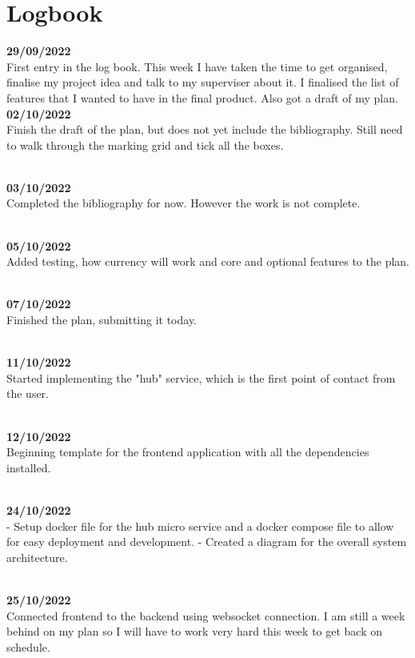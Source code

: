 \documentclass[titlepage]{article}
\begin{document}



\section{Logbook}

\textbf{29/09/2022} \\
First entry in the log book. This week I have taken the time to get organised, finalise my project idea and talk to my superviser about it. I finalised the list of features that I wanted to have in the final product. Also got a draft of my plan.
\\

\noindent
\textbf{02/10/2022} \\
Finish the draft of the plan, but does not yet include the bibliography. Still need to walk through the marking grid and tick all the boxes.

\\
\noindent
\textbf{03/10/2022} \\
Completed the bibliography for now. However the work is not complete.

\\
\noindent
\textbf{05/10/2022} \\
Added testing, how currency will work and core and optional features to the plan.

\\
\noindent
\textbf{07/10/2022} \\
Finished the plan, submitting it today.

\\
\noindent
\textbf{11/10/2022} \\
Started implementing the "hub" service, which is the first point of contact from the user.

\\
\noindent
\textbf{12/10/2022} \\
Beginning template for the frontend application with all the dependencies installed.

\\
\noindent
\textbf{24/10/2022} \\
- Setup docker file for the hub micro service and a docker compose file to allow for easy deployment and development.
- Created a diagram for the overall system architecture.

\\
\noindent
\textbf{25/10/2022} \\
Connected frontend to the backend using websocket connection. I am still a week behind on my plan so I will have to work very hard this week to get back on schedule.
\end{document}
